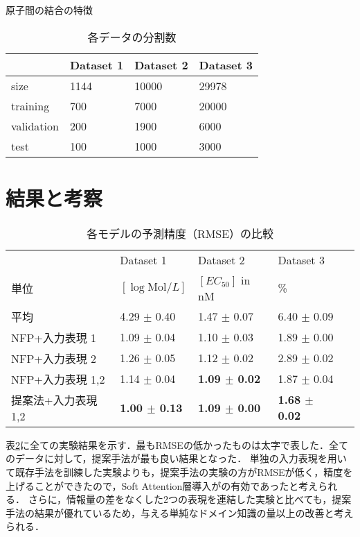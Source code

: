 \documentclass[twocolumn]{jarticle}
\begin{document}
\begin{table}[htb]
  \caption{原子間の結合の特徴}
      \vspace{1em}
  \label{tab:bond}
  \begin{tabular}{llll} \hline
	& Dataset 1  & Dataset 2 & Dataset 3 \\ \hline \hline
	size & 1144 & 10000 & 29978 \\ 
	training & 700 & 7000 & 20000 \\ 
	validation & 200 & 1900 & 6000 \\ 
	test & 100 & 1000 & 3000 \\ \hline
  \end{tabular}
        \vspace{-2ex}
  \caption{各データの分割数}
  \label{tab:data}
\end{table}

\vspace{-11pt}
\section{結果と考察}
\begin{table}[htb]
\scriptsize
  \begin{tabular}{lllll}\hline
  			 				   &  Dataset 1 \cite{delaney} & Dataset 2 \cite{malaria} & Dataset 3 \cite{cep}    \\  
	単位	    			   &     $[\log{\mathrm{Mol}/L}]$    &     $[EC_{50}]$ in nM & \%                   \\ \hline \hline
	 平均\cite{NNFP}	       &     4.29 $\pm$ 0.40    &     1.47 $\pm$ 0.07   &     6.40 $\pm$ 0.09  \\ \hline 
	NFP+入力表現 1 			   &     1.09 $\pm$ 0.04    &     1.10 $\pm$ 0.03   &     1.89 $\pm$ 0.00  \\ 
	NFP+入力表現 2 			   &     1.26 $\pm$ 0.05    &     1.12 $\pm$ 0.02   &     2.89 $\pm$ 0.02  \\ 
	NFP+入力表現 1,2	 	   &     1.14 $\pm$ 0.04    & \bf{1.09 $\pm$ 0.02}  &     1.87 $\pm$ 0.04  \\ 
	提案法+入力表現 1,2 & \bf{1.00 $\pm$ 0.13}   & \bf{1.09 $\pm$ 0.00}  & \bf{1.68 $\pm$ 0.02} \\ \hline
  \end{tabular}
        \vspace{-2ex}
  \caption{各モデルの予測精度（RMSE）の比較}
  \label{tab:rmse}
\end{table}

表\ref{tab:rmse}に全ての実験結果を示す．最もRMSEの低かったものは太字で表した．全てのデータに対して，提案手法が最も良い結果となった．
単独の入力表現を用いて既存手法を訓練した実験よりも，提案手法の実験の方がRMSEが低く，精度を上げることができたので，Soft Attention層導入がの有効であったと考えられる．
さらに，情報量の差をなくした2つの表現を連結した実験と比べても，提案手法の結果が優れているため，与える単純なドメイン知識の量以上の改善と考えられる．
\end{document}
